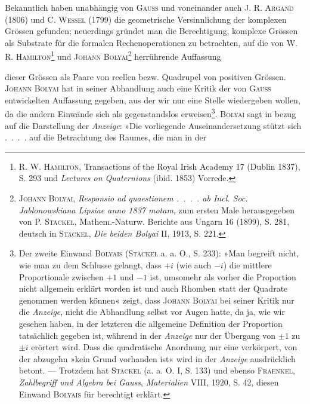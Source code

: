 \par\indent Bekanntlich haben unabhängig von \textsc{Gauss} und voneinander auch \textsc{J. R.
Argand} (1806) und \textsc{C. Wessel} (1799) die geometrische Versinnlichung der
komplexen Grössen gefunden; neuerdings gründet man die Berechtigung, komplexe
Grössen als Substrate für die formalen Rechenoperationen zu betrachten,
auf die von \textsc{W. R. Hamilton}\footnote{\textsc{R. W. Hamilton}, Transactions of the Royal Irish Academy 17 (Dublin 1837), S. 293 und \textit{Lectures on Quaternions} (ibid. 1853) Vorrede.} und \textsc{Johann Bolyai}\footnote{\textsc{Johann Bolyai}, \textit{Responsio ad quaestionem .\ .\ .\ . ab Incl. Soc. Jablonowskiana Lipsiae anno
1837 motam}, zum ersten Male herausgegeben von \textsc{P. Stäckel}, Mathem.-Naturw. Berichte aus Ungarn 16
(1899), S. 281, deutsch in \textsc{Stäckel}, \textit{Die beiden Bolyai} II, 1913, S. 221.} herrührende Auffassung\par
\clearpage{}
\noindent dieser Grössen als Paare von reellen bezw. Quadrupel von positiven Grössen.
\textsc{Johann Bolyai} hat in seiner Abhandlung auch eine Kritik der von \textsc{Gauss}
entwickelten Auffassung gegeben, aus der wir nur eine Stelle wiedergeben
wollen, da die andern Einwände sich als gegenstandslos erweisen\footnote{Der zweite Einwand \textsc{Bolyais} (\textsc{Stäckel} a. a. O., S. 233): »Man begreift nicht, wie man zu dem
Schlusse gelangt, dass \(+i\) (wie auch \(-i\)) die mittlere Proportionale zwischen \(+1\) und \(-1\) ist, umsomehr
als vorher die Proportion nicht allgemein erklärt worden ist und auch Rhomben statt der Quadrate genommen
werden können« zeigt, dass \textsc{Johann Bolyai} bei seiner Kritik nur die \textit{Anzeige}, nicht die Abhandlung
selbst vor Augen hatte, da ja, wie wir gesehen haben, in der letzteren die allgemeine Definition der
Proportion tatsächlich gegeben ist, während in der \textit{Anzeige} nur der Übergang von \(\pm1\) zu \(\pm i\) erörtert
wird. Dass die quadratische Anordnung nur eine  verkörpert, von der abzugehn »kein Grund
vorhanden ist« wird in der \textit{Anzeige} ausdrücklich betont. — Trotzdem hat \textsc{Stäckel} (a. a. O. I, S. 133) und
ebenso \textsc{Fraenkel}, \textit{Zahlbegriff und Algebra bei Gauss}, \textit{Materialien} VIII, 1920, S. 42, diesen Einwand
\textsc{Bolyais} für berechtigt erklärt.}. \textsc{Bolyai}
sagt in bezug auf die Darstellung der \textit{Anzeige}: »Die vorliegende Auseinandersetzung
stützt sich .\ .\ .\ . auf die Betrachtung des Raumes, die man in der
